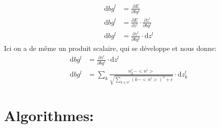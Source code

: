 \documentclass[12pt,a4paper]{extarticle}
\newcommand{\ud}{\mathrm{d}}
\begin{document}
\begin{align}
\ud bg^l &= \frac{\partial E}{\partial bg^l} \\
\ud bg^l &= \frac{\partial E}{\partial z^l}\cdot\frac{\partial z^l}{\partial bg^l}  \\
\ud bg^l &= \frac{\partial z^l}{\partial bg^l}\cdot \ud z^l 
\end{align}
Ici on a de même un produit scalaire, qui se développe et nous donne:
\begin{align}
\ud bg^l &= \frac{\partial z^l}{\partial bg^l}\cdot \ud z^l \\
\ud bg^l &= \sum_k \frac{n^l_k-<n^l>}{\sqrt{\sum_{k\in n^l}(k-<n^l>)^2+\epsilon}}\cdot \ud z^l_k 
\end{align}

\newpage


\part{Algorithmes:}
\end{document}
